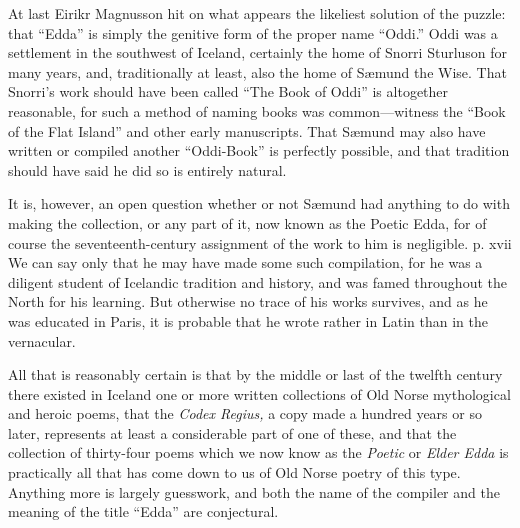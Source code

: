 \documentclass{scrbook}
\newcommand{\mdash}{---}
\begin{document}
At last Eirikr Magnusson hit on what appears the likeliest solution of the puzzle: that ``Edda'' is simply the genitive form of the proper name ``Oddi.'' Oddi was a settlement in the southwest of Iceland, certainly the home of Snorri Sturluson for many years, and, traditionally at least, also the home of Sæmund the Wise. That Snorri's work should have been called ``The Book of Oddi'' is altogether reasonable, for such a method of naming books was common{\mdash}witness the ``Book of the Flat Island'' and other early manuscripts. That Sæmund may also have written or compiled another ``Oddi-Book'' is perfectly possible, and that tradition should have said he did so is entirely natural.

It is, however, an open question whether or not Sæmund had anything to do with making the collection, or any part of it, now known as the Poetic Edda, for of course the seventeenth-century assignment of the work to him is negligible. p. xvii We can say only that he may have made some such compilation, for he was a diligent student of Icelandic tradition and history, and was famed throughout the North for his learning. But otherwise no trace of his works survives, and as he was educated in Paris, it is probable that he wrote rather in Latin than in the vernacular.

All that is reasonably certain is that by the middle or last of the twelfth century there existed in Iceland one or more written collections of Old Norse mythological and heroic poems, that the \emph{Codex Regius,} a copy made a hundred years or so later, represents at least a considerable part of one of these, and that the collection of thirty-four poems which we now know as the \emph{Poetic} or \emph{Elder Edda} is practically all that has come down to us of Old Norse poetry of this type. Anything more is largely guesswork, and both the name of the compiler and the meaning of the title ``Edda'' are conjectural.

\end{document}
